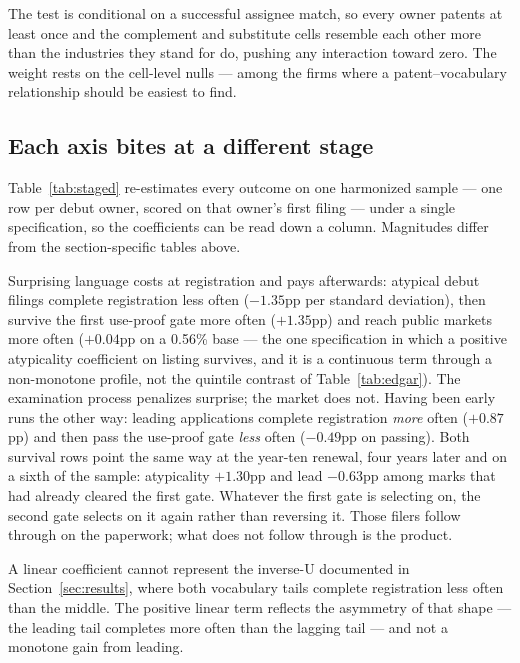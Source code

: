 The test is conditional on a successful assignee match, so every owner patents at least once and the
complement and substitute cells resemble each other more than the industries
they stand for do, pushing any interaction toward zero. The weight rests on
the cell-level nulls --- among the firms where a patent--vocabulary
relationship should be easiest to find.

\subsection{Each axis bites at a different stage}\label{sec:staged}

Table~\ref{tab:staged} re-estimates every outcome on one harmonized sample
--- one row per debut owner, scored on that owner's first filing --- under a
single specification, so the coefficients can be read down a column. Magnitudes differ from the section-specific tables above.



Surprising language costs at registration and
pays afterwards: atypical debut filings complete registration less often
($-1.35$pp per standard deviation), then survive the first use-proof gate
more often ($+1.35$pp) and reach public markets more often ($+0.04$pp on a
0.56\% base --- the one specification in which a positive atypicality
coefficient on listing survives, and it is a continuous term through a
non-monotone profile, not the quintile contrast of Table~\ref{tab:edgar}). The examination process penalizes surprise; the market does
not. Having been early runs the other way: leading applications complete
registration \emph{more} often ($+0.87$pp) and then pass the use-proof gate
\emph{less} often ($-0.49$pp on passing). Both survival rows point the same
way at the year-ten renewal, four years later and on a sixth of the
sample: atypicality $+1.30$pp and lead $-0.63$pp among marks that had
already cleared the first gate. Whatever the first gate is selecting on,
the second gate selects on it again rather than reversing it. Those filers follow through on the paperwork;
what does not follow through is the product.

A linear coefficient cannot represent the inverse-U documented in Section~\ref{sec:results}, where
both vocabulary tails complete registration less often than the middle. The
positive linear term reflects the asymmetry of that shape --- the leading
tail completes more often than the lagging tail --- and not a monotone gain
from leading.

